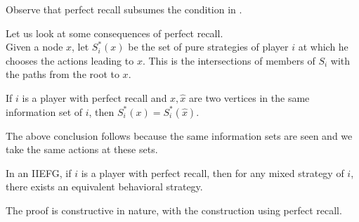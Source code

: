 	Observe that perfect recall subsumes the condition in .

	Let us look at some consequences of perfect recall.\\
	Given a node $x$, let $S_i^*(x)$ be the set of pure strategies of player $i$ at which he chooses the actions leading to $x$. This is the intersections of members of $S_i$ with the paths from the root to $x$.
	\begin{ftheo}
		If $i$ is a player with perfect recall and $x,\hat{x}$ are two vertices in the same information set of $i$, then $S_i^*(x) = S_i^*(\hat{x})$.
	\end{ftheo}

	The above conclusion follows because the same information sets are seen and we take the same actions at these sets.

	\begin{ftheo}[Kuhn]
		In an IIEFG, if $i$ is a player with perfect recall, then for any mixed strategy of $i$, there exists an equivalent behavioral strategy.
	\end{ftheo}
	The proof is constructive in nature, with the construction using perfect recall.